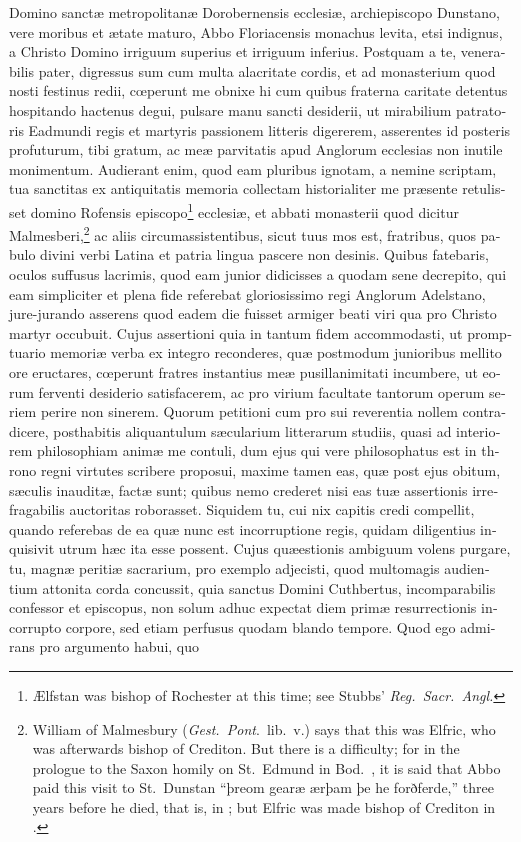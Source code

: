 \documentclass[10pt]{book}
\begin{document}
\begin{paracol}{2}
\begin{otherlanguage}{latin}
Domino sanct\ae{} metropolitan\ae{} Dorobernensis ecclesi\ae{}, archiepiscopo Dunstano, vere moribus et \ae{}tate maturo, Abbo Floriacensis monachus levita, etsi indignus, a Christo Domino irriguum superius et irriguum inferius. Postquam a te, venerabilis pater, digressus sum cum multa alacritate cordis, et ad monasterium quod nosti festinus redii, c\oe{}perunt me obnixe hi cum quibus fraterna caritate detentus hospitando hactenus degui, pulsare manu sancti desiderii, ut mirabilium patratoris Eadmundi regis et martyris passionem litteris digererem, asserentes id posteris profuturum, tibi gratum, ac me\ae{} parvitatis apud Anglorum ecclesias non inutile monimentum. Audierant enim, quod eam pluribus ignotam, a nemine scriptam, tua sanctitas ex antiquitatis memoria collectam historialiter me pr\ae{}sente retulisset domino Rofensis episcopo\footnote[\textdagger]{\AE{}lfstan was bishop of Rochester at this time; see Stubbs' \emph{Reg.\ Sacr.\ Angl.}} ecclesi\ae{}, et abbati monasterii quod dicitur Malmesberi,\footnote[\ddag]{William of Malmesbury (\emph{Gest.\ Pont}.\ lib.\ v.) says that this was Elfric, who was afterwards bishop of Crediton. But there is a difficulty; for in the prologue to the Saxon homily on St.\ Edmund in Bod.\ , it is said that Abbo paid this visit to St.\ Dunstan ``þreom gear\ae{} \ae{}rþam þe he forðferde,'' three years before he died, that is, in ; but Elfric was made bishop of Crediton in .} ac aliis circumassistentibus, sicut tuus mos est, fratribus, quos pabulo divini verbi Latina et patria lingua pascere non desinis. Quibus fatebaris, oculos suffusus lacrimis, quod eam junior didicisses a quodam sene decrepito, qui eam simpliciter et plena fide referebat gloriosissimo regi Anglorum Adelstano, jure-jurando asserens quod eadem die fuisset armiger beati viri qua pro Christo martyr occubuit. Cujus assertioni quia in tantum fidem accommodasti, ut promptuario memori\ae{} verba ex integro reconderes, qu\ae{} postmodum junioribus mellito ore eructares, c\oe{}perunt fratres instantius me\ae{} pusillanimitati incumbere, ut eorum ferventi desiderio satisfacerem, ac pro virium facultate tantorum operum seriem perire non sinerem. Quorum petitioni cum pro sui reverentia nollem contradicere, posthabitis aliquantulum s\ae{}cularium litterarum studiis, quasi ad interiorem philosophiam anim\ae{} me contuli, dum ejus qui vere philosophatus est in throno regni virtutes scribere proposui, maxime tamen eas, qu\ae{} post ejus obitum, s\ae{}culis inaudit\ae{}, fact\ae{} sunt; quibus nemo crederet nisi eas tu\ae{} assertionis irrefragabilis auctoritas roborasset. Siquidem tu, cui nix capitis credi compellit, quando referebas de ea qu\ae{} nunc est incorruptione regis, quidam diligentius inquisivit utrum h\ae{}c ita esse possent. Cujus qu\ae{}estionis ambiguum volens purgare, tu, magn\ae{} periti\ae{} sacrarium, pro exemplo adjecisti, quod multomagis audientium attonita corda concussit, quia sanctus Domini Cuthbertus, incomparabilis confessor et episcopus, non solum adhuc expectat diem prim\ae{} resurrectionis incorrupto corpore, sed etiam perfusus quodam blando tempore. Quod ego admirans pro argumento habui, quo 
\end{otherlanguage}
\end{paracol}
\end{document}
